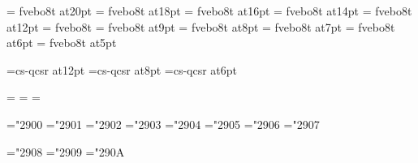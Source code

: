 \font\twentyslbf=      fvebo8t at20pt
\font\eighteenslbf=    fvebo8t at18pt
\font\sixteenslbf=     fvebo8t at16pt
\font\fourteenslbf=    fvebo8t at14pt
\font\twelveslbf=      fvebo8t at12pt
\font\slbf=            fvebo8t
\font\nineslbf=        fvebo8t at9pt
\font\eightslbf=       fvebo8t at8pt
\font\sevenslbf=       fvebo8t at7pt
\font\sixslbf=         fvebo8t at6pt
\font\fiveslbf=        fvebo8t at5pt



%
%
\font\tenepi=cs-qcsr at12pt
\font\sevenepi=cs-qcsr at8pt
\font\fiveepi=cs-qcsr at6pt

=\tenepi
{}=\sevenepi
{}=\fiveepi
\def\missepi{\fam=9}

\mathchardef\Gamma="2900
\mathchardef\Delta="2901
\mathchardef\Theta="2902
\mathchardef\Lambda="2903
\mathchardef\Xi="2904
\mathchardef\Pi="2905
\mathchardef\Sigma="2906
\mathchardef\Upsilon="2907

\mathchardef\Phi="2908
\mathchardef\Psi="2909
\mathchardef\Omega="290A

%
\rm 